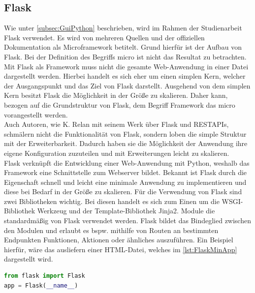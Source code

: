 \documentclass[a4paper,titlepage,halfparskip,12pt]{scrreprt}
\begin{document}
\begin{onehalfspacing}
\subsection{Flask}
\label{subsec:Flask}
Wie unter \autoref{subsec:GuiPython} beschrieben, wird im Rahmen der Studienarbeit Flask verwendet. Es wird von mehreren Quellen und der offiziellen Dokumentation als Microframework betitelt. Grund hierfür ist der Aufbau von Flask. Bei der Definition des Begriffs \glqq micro\grqq{} ist nicht das Resultat zu betrachten. Mit Flask als Framework muss nicht die gesamte Web-Anwendung in einer Datei dargestellt werden. Hierbei handelt es sich eher um einen simplen Kern, welcher der Ausgangspunkt und das Ziel von Flask darstellt. Ausgehend von dem simplen Kern besitzt Flask die Möglichkeit in der Größe zu skalieren. Daher kann, bezogen auf die Grundstruktur von Flask, dem Begriff Framework das \glqq micro\grqq{} vorangestellt werden.\cite{FlaskDoc}\\
Auch Autoren, wie K. Relan mit seinem Werk über Flask und RESTAPIs, schmälern nicht die Funktionalität von Flask, sondern loben die simple Struktur mit der Erweiterbarkeit. Dadurch haben sie die Möglichkeit der Anwendung ihre eigene Konfiguration zuzuteilen und mit Erweiterungen leicht zu skalieren. \cite{FlaskRESTAPIsRelan}\\
Flask verknüpft die Entwicklung einer Web-Anwendung mit Python, weshalb das Framework eine Schnittstelle zum Webserver bildet. Bekannt ist Flask durch die Eigenschaft schnell und leicht eine minimale Anwendung zu implementieren und diese bei Bedarf in der Größe zu skalieren. Für die Verwendung von Flask sind zwei Bibliotheken wichtig. Bei diesen handelt es sich zum Einen um die \ac{WSGI}-Bibliothek Werkzeug und der Template-Bibliothek Jinja2. Module die standardmäßig von Flask verwendet werden. Flask bildet das Bindeglied zwischen den Modulen und erlaubt es bspw. mithilfe von Routen an bestimmten Endpunkten Funktionen, Aktionen oder ähnliches auszuführen. Ein Beispiel hierfür, wäre das ausliefern einer \ac{HTML}-Datei, welches im \autoref{lst:FlaskMinApp} dargestellt wird.
\begin{lstlisting}[language=Python,caption=Example Listing of Flask Python,label={lst:FlaskMinApp}]
from flask import Flask
app = Flask(__name__)


\end{lstlisting}
\end{onehalfspacing}
\end{document}
